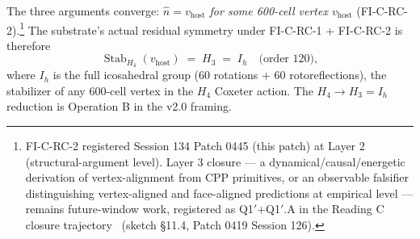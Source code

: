\documentclass[11pt,letterpaper]{article}
\newcommand{\Hfour}{H_4}
\newcommand{\Stab}{\operatorname{Stab}}
\begin{document}
The three arguments converge: \emph{$\hat{n} = v_{\text{host}}$ for some 600-cell vertex $v_{\text{host}}$} (FI-C-RC-2).\footnote{FI-C-RC-2 registered Session 134 Patch 0445 (this patch) at Layer 2 (structural-argument level). Layer 3 closure --- a dynamical/causal/energetic derivation of vertex-alignment from CPP primitives, or an observable falsifier distinguishing vertex-aligned and face-aligned predictions at empirical level --- remains future-window work, registered as Q1$'$+Q1$'$.A in the Reading C closure trajectory~\cite{abshier_capotauro_chiral_mechanism_sketch} (sketch \S11.4, Patch 0419 Session 126).} The substrate's actual residual symmetry under FI-C-RC-1 + FI-C-RC-2 is therefore
\[
\Stab_{\Hfour}(v_{\text{host}}) \;=\; H_3 \;=\; I_h \quad \text{(order 120)},
\]
where $I_h$ is the full icosahedral group (60 rotations + 60 rotoreflections), the stabilizer of any 600-cell vertex in the $\Hfour$ Coxeter action. The $\Hfour \to H_3 = I_h$ reduction is Operation B in the v2.0 framing.
\end{document}
